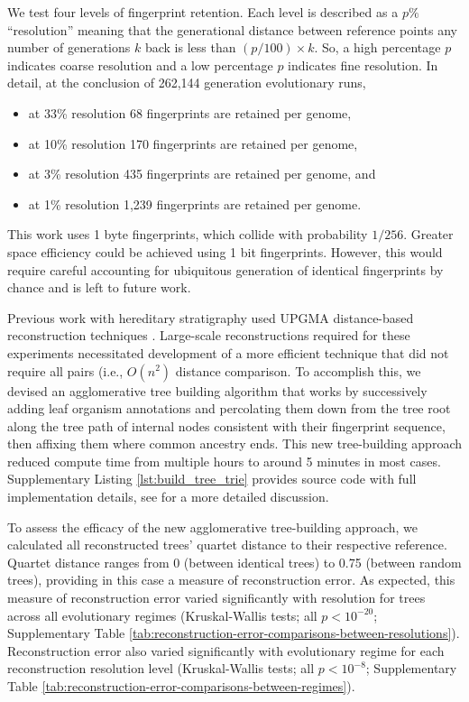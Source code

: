 We test four levels of fingerprint retention.
Each level is described as a $p\%$ ``resolution'' meaning that the generational distance between reference points any number of generations $k$ back is less than $(p / 100) \times k$.
So, a high percentage $p$ indicates coarse resolution and a low percentage $p$ indicates fine resolution.
In detail, at the conclusion of 262,144 generation evolutionary runs,
\begin{itemize}
  \item at 33\% resolution 68 fingerprints are retained per genome,
  \item at 10\% resolution 170 fingerprints are retained per genome,
  \item at 3\% resolution 435 fingerprints are retained per genome, and
  \item at 1\% resolution 1,239 fingerprints are retained per genome.
\end{itemize}

This work uses 1 byte fingerprints, which collide with probability $1/256$.
Greater space efficiency could be achieved using 1 bit fingerprints.
However, this would require careful accounting for ubiquitous generation of identical fingerprints by chance and is left to future work.

Previous work with hereditary stratigraphy used UPGMA distance-based reconstruction techniques \citep{moreno2022hereditary}.
Large-scale reconstructions required for these experiments necessitated development of a more efficient technique that did not require all pairs (i.e., $O(n^2)$ distance comparison.
To accomplish this, we devised an agglomerative tree building algorithm that works by successively adding leaf organism annotations and percolating them down from the tree root along the tree path of internal nodes consistent with their fingerprint sequence, then affixing them where common ancestry ends.
This new tree-building approach reduced compute time from multiple hours to around 5 minutes in most cases.
Supplementary Listing \ref{lst:build_tree_trie} provides source code with full implementation details, see \citep{moreno2024analysis} for a more detailed discussion.



To assess the efficacy of the new agglomerative tree-building approach, we calculated all reconstructed trees' quartet distance to their respective reference.
Quartet distance ranges from 0 (between identical trees) to 0.75 (between random trees), providing in this case a measure of reconstruction error.
As expected, this measure of reconstruction error varied significantly with resolution for trees across all evolutionary regimes (Kruskal-Wallis tests; all $p < 10^{-20}$; Supplementary Table \ref{tab:reconstruction-error-comparisons-between-resolutions}).
Reconstruction error also varied significantly with evolutionary regime for each reconstruction resolution level (Kruskal-Wallis tests; all $p < 10^{-8}$; Supplementary Table \ref{tab:reconstruction-error-comparisons-between-regimes}).

